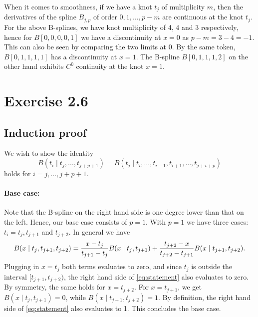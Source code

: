 \documentclass[a4paper]{article}
\begin{document}
    When it comes to smoothness, if we have a knot $t_j$ of multiplicity $m$,
    then the derivatives of the spline $B_{j, p}$ of order $0, 1, \ldots, p -
    m$ are continuous at the knot $t_j$. For the above B-splines, we have knot
    multiplicity of 4, 4 and 3 respectively, hence for $B[0, 0, 0, 0, 1]$ we
    have a discontinuity at $x = 0$ as $p - m = 3 - 4 = -1$. This can also be
    seen by comparing the two limits at 0. By the same token, $B[0, 1, 1, 1,
    1]$ has a discontinuity at $x = 1$. The B-spline $B[0, 1, 1, 1, 2]$ on the
    other hand exhibits $C^0$ continuity at the knot $x = 1$.
    

    \section*{Exercise 2.6}
    
    \subsection*{Induction proof}
    We wish to show the identity
    \begin{equation}
        \label{eq:statement}
        B(t_i \mid t_j, \ldots, t_{j+p+1}) = B(t_j \mid t_i, \ldots, t_{i-1}, t_{i+1}, \ldots, t_{j + i + p})
    \end{equation}
    holds for $i = j, \ldots, j+p+1$. 
    
    \paragraph{Base case:} Note that the B-spline on the right hand
    side is one degree lower than that on the left. Hence, our base case
    consists of $p = 1$. With $p = 1$ we have three cases: $t_i = t_j, t_{j+1}$
    and $t_{j+2}$. In general we have
    \begin{equation}
        \notag
        B(x \mid t_j, t_{j+1}, t_{j+2}) = \frac{x - t_j}{t_{j+1} - t_j} B(x \mid t_j, t_{j+1}) 
                                        + \frac{t_{j+2} - x}{t_{j+2} - t_{j+1}} B(x \mid t_{j+1}, t_{j+2}).
    \end{equation}
    Plugging in $x = t_j$ both terms evaluates to zero, and since $t_j$ is
    outside the interval $[t_{j+1}, t_{j+2})$, the right hand side of
    \cref{eq:statement} also evaluates to zero. By symmetry, the same holds for
    $x = t_{j+2}$. For $x = t_{j+1}$, we get $B(x \mid t_j, t_{j+1}) = 0$,
    while $B(x \mid t_{j+1}, t_{j+2}) = 1$. By definition, the right hand side
    of \cref{eq:statement} also evaluates to 1. This concludes the base case.
\end{document}
